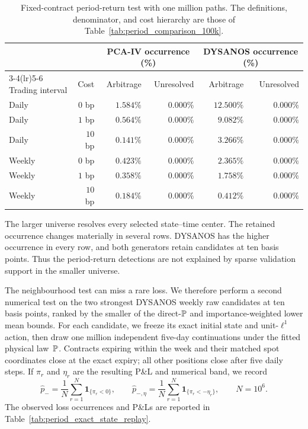 \begin{table}[H]
\centering
\small
\setlength{\tabcolsep}{4pt}
\begin{tabular}{lrrrrr}
\toprule
 & & \multicolumn{2}{c}{PCA-IV occurrence (\%)}
       & \multicolumn{2}{c}{DYSANOS occurrence (\%)}\\
\cmidrule(lr){3-4}\cmidrule(lr){5-6}
Trading interval & Cost & Arbitrage & Unresolved
                         & Arbitrage & Unresolved\\
\midrule
Daily  & $0$ bp  & $1.584\%$ & $0.000\%$ & $12.500\%$ & $0.000\%$\\
Daily  & $1$ bp  & $0.564\%$ & $0.000\%$ & $9.082\%$  & $0.000\%$\\
Daily  & $10$ bp & $0.141\%$ & $0.000\%$ & $3.266\%$  & $0.000\%$\\
Weekly & $0$ bp  & $0.423\%$ & $0.000\%$ & $2.365\%$  & $0.000\%$\\
Weekly & $1$ bp  & $0.358\%$ & $0.000\%$ & $1.758\%$  & $0.000\%$\\
Weekly & $10$ bp & $0.184\%$ & $0.000\%$ & $0.412\%$  & $0.000\%$\\
\bottomrule
\end{tabular}
\caption{Fixed-contract period-return test with one million paths. The
definitions, denominator, and cost hierarchy are those of
Table~\ref{tab:period_comparison_100k}.}
\label{tab:period_comparison_1m}
\end{table}

The larger universe resolves every selected state--time center. The retained
occurrence changes materially in several rows. DYSANOS has the higher
occurrence in every row, and both generators retain candidates at ten basis
points. Thus the period-return detections are not explained by sparse
validation support in the smaller universe.

The neighbourhood test can miss a rare loss. We therefore perform a second
numerical test on the two strongest DYSANOS weekly raw candidates at ten basis
points, ranked by the smaller of the direct-$\P$ and importance-weighted lower
mean bounds. For each candidate, we freeze its exact initial state and
unit-$\ell^1$ action, then draw one million independent five-day
continuations under the fitted physical law~$\P$. Contracts expiring within
the week and their matched spot coordinates close at the exact expiry; all
other positions close after five daily steps. If $\pi_r$ and $\eta_r$ are the
resulting P\&L and numerical band, we record
\begin{equation}\label{eq:period_exact_state_loss}
 \widehat p_-=\frac{1}{N}\sum_{r=1}^N\bm 1_{\{\pi_r<0\}},
 \qquad
 \widehat p_{-,\eta}=\frac{1}{N}\sum_{r=1}^N
                 \bm 1_{\{\pi_r<-\eta_r\}},
 \qquad N=10^6.
\end{equation}
The observed loss occurrences and P\&Ls are reported in
Table~\ref{tab:period_exact_state_replay}.

